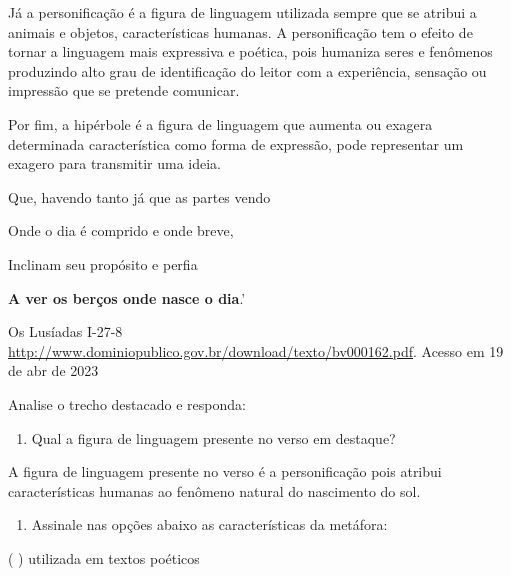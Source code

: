 {Já a personificação é a figura de linguagem utilizada sempre que se
atribui a animais e objetos, características humanas. A personificação
tem o efeito de tornar a linguagem mais expressiva e poética, pois
humaniza seres e fenômenos produzindo alto grau de identificação do
leitor com a experiência, sensação ou impressão que se pretende
comunicar.

Por fim, a hipérbole é a figura de linguagem que aumenta ou exagera
determinada característica como forma de expressão, pode representar um
exagero para transmitir uma ideia.



Que, havendo tanto já que as partes vendo

Onde o dia é comprido e onde breve,

Inclinam seu propósito e perfia

\textbf{A ver os berços onde nasce o dia}.'

Os Lusíadas I-27-8
\href{http://www.dominiopublico.gov.br/download/texto/bv000162.pdf}{\uline{http://www.dominiopublico.gov.br/download/texto/bv000162.pdf}}.
Acesso em 19 de abr de 2023

Analise o trecho destacado e responda:

\begin{enumerate}
\def\labelenumi{\arabic{enumi})}
\tightlist
\item
  Qual a figura de linguagem presente no verso em destaque?
\end{enumerate}

A figura de linguagem presente no verso é a personificação pois atribui
características humanas ao fenômeno natural do nascimento do sol.

\begin{enumerate}
\def\labelenumi{\arabic{enumi})}
\setcounter{enumi}{1}
\tightlist
\item
  Assinale nas opções abaixo as características da metáfora:
\end{enumerate}

( ) utilizada em textos poéticos

}
